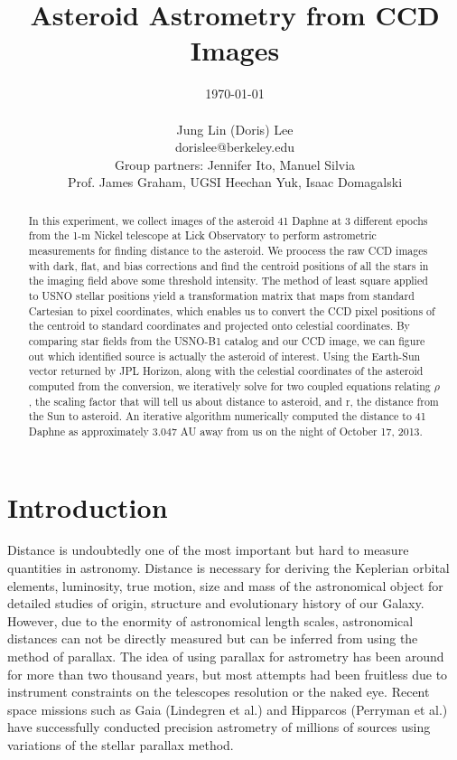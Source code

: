 \documentclass[authoryear, 12pt,5p, times]{elsarticle}
\begin{document}
\begin{frontmatter}
\title{Asteroid Astrometry from CCD Images}
\author{\today \\ \quad \\Jung Lin (Doris) Lee\\ dorislee@berkeley.edu\\Group partners: Jennifer Ito, Manuel Silvia\\Prof. James Graham, UGSI Heechan Yuk, Isaac Domagalski}
	\begin{abstract}
In this experiment, we collect images of the asteroid 41 Daphne at 3 different epochs from the 1-m Nickel telescope at Lick Observatory to perform astrometric measurements for finding distance to the asteroid. We proocess the raw CCD images with dark, flat, and bias corrections and find the centroid positions of all the stars in the imaging field above some threshold intensity. The method of least square applied to USNO stellar positions yield a transformation matrix that maps from standard Cartesian to pixel coordinates, which enables us to convert the CCD pixel positions of the centroid to standard coordinates and projected onto celestial coordinates. By comparing star fields from the USNO-B1 catalog and our CCD image, we can figure out which identified source is actually the asteroid of interest. Using the Earth-Sun vector returned by JPL Horizon, along with the celestial coordinates of the asteroid computed from the conversion, we iteratively solve for two coupled equations relating $\rho$, the scaling factor that will tell us about distance to asteroid, and r, the distance from the Sun to asteroid. An iterative algorithm numerically computed the distance to 41 Daphne as approximately 3.047 AU away from us on the night of October 17, 2013. 
	\end{abstract}
\end{frontmatter}
\section{Introduction}
Distance is undoubtedly one of the most important but hard to measure quantities in astronomy. Distance is necessary for deriving the Keplerian orbital elements, luminosity, true motion, size and mass of the astronomical object for detailed studies of origin, structure and evolutionary history of our Galaxy. However, due to the enormity of astronomical length scales, astronomical distances can not be directly measured but can be inferred from using the method of parallax. The idea of using parallax for astrometry has been around for more than two thousand years, but most attempts had been fruitless due to instrument constraints on the telescopes resolution or the naked eye. Recent space missions such as Gaia (Lindegren et al.) and  Hipparcos (Perryman et al.) have successfully conducted precision astrometry of millions of sources using variations of the stellar parallax method.
\end{document}
